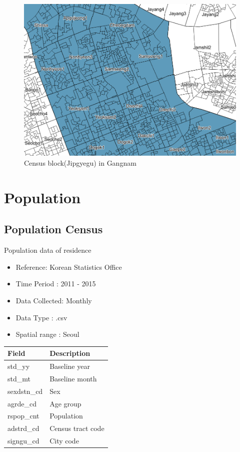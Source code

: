 \documentclass[]{book}
\providecommand{\tightlist}{%
  \setlength{\itemsep}{0pt}\setlength{\parskip}{0pt}}
\begin{document}
\begin{figure}

{\centering \includegraphics[width=12.99in]{images/05_jip} 

}

\caption{\label{fig:figs} Census block(Jipgyegu) in Gangnam}\label{fig:unnamed-chunk-5}
\end{figure}

\chapter{Population}\label{population}

\section{Population Census}\label{population-census}

Population data of residence

\begin{itemize}
\tightlist
\item
  Reference: Korean Statistics Office
\item
  Time Period : 2011 - 2015
\item
  Data Collected: Monthly
\item
  Data Type : .csv
\item
  Spatial range : Seoul 
\end{itemize}

\begin{longtable}[]{@{}ll@{}}
\toprule
Field & Description\tabularnewline
\midrule
\endhead
std\_yy & Baseline year\tabularnewline
std\_mt & Baseline month\tabularnewline
sexdstn\_cd & Sex\tabularnewline
agrde\_cd & Age group\tabularnewline
rspop\_cnt & Population\tabularnewline
adstrd\_cd & Census tract code\tabularnewline
signgu\_cd & City code\tabularnewline
\bottomrule
\end{longtable}
\end{document}

